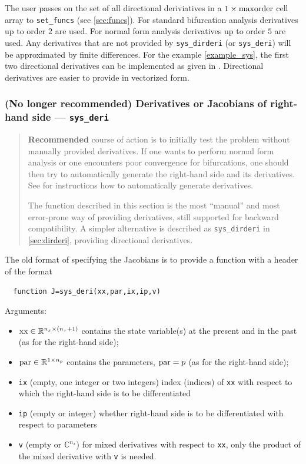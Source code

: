 \documentclass[10pt]{scrartcl}
\newcommand{\RR}{\mathbb{R}}
\newcommand{\CC}{\mathbb{C}}
\newcommand{\blist}[1]{\mbox{\lstinline!#1!}}
\begin{document}
The user passes on the set of all directional deriviatives in a
$1\times\blist{maxorder}$ cell array to \blist{set_funcs} (see
\cref{sec:funcs}). For standard bifurcation analysis derivatives up to
order $2$ are used. For normal form analysis derivatives up to order
$5$ are used. Any derivatives that are not provided by  \blist{sys_dirderi} (or \blist{sys_deri}) will be approximated by finite
differences. For the example \eqref{example_sys}, the first two
directional derivatives can be implemented as given in
.  Directional derivatives are easier to
provide in vectorized form.


\subsubsection{(No longer recommended) Derivatives or Jacobians of right-hand side ---
  \texorpdfstring{\blist{sys_deri}}{sys\_deri}}\label{sec:constjac}
\begin{quote}
  \textbf{Recommended} course of action is to initially test the
  problem without manually provided derivatives. If one wants to
  perform normal form analysis or one encounters poor convergence for
  bifurcations, one should then try to automatically generate the
  right-hand side and its derivatives. See  for
  instructions how to automatically generate derivatives.

  The function described in this section is the most ``manual'' and most
  error-prone way of providing derivatives, still supported for
  backward compatibility. A simpler alternative is described as
  \blist{sys_dirderi} in \cref{sec:dirderi}, providing directional
  derivatives.
\end{quote}
The old format of specifying the Jacobians is to provide a function
with a header of the format
\begin{lstlisting}
  function J=sys_deri(xx,par,ix,ip,v)
\end{lstlisting}
Arguments:
\begin{itemize}
\item $\blist{xx}\in\RR^{n_x\times (n_\tau+1)}$ contains the state
variable(s) at the present and in the past (as for the right-hand side);
\item $\blist{par}\in\RR^{1\times n_p}$ contains the parameters, $\blist{par}=p$  (as for the right-hand side);
\item \blist{ix} (empty, one integer or two integers) index (indices) of
  \blist{xx} with respect to which the right-hand side is to be
  differentiated
\item \blist{ip} (empty or integer) whether right-hand side is to be
  differentiated with respect to parameters
\item \blist{v} (empty or $\CC^{n_x}$) for mixed derivatives with respect
  to \blist{xx}, only the product of the mixed derivative with
  \blist{v} is needed.
\end{itemize}
\end{document}
